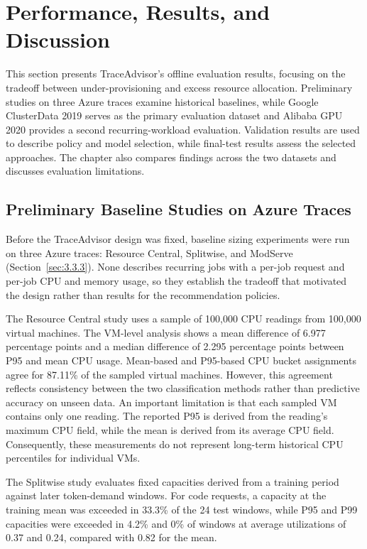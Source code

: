 \section{Performance, Results, and Discussion}\label{sec:7}

This section presents TraceAdvisor's offline evaluation results, focusing on the tradeoff between under-provisioning and excess resource allocation. Preliminary studies on three Azure traces examine historical baselines, while Google ClusterData 2019 \cite{ref7} serves as the primary evaluation dataset and Alibaba GPU 2020 \cite{ref19} provides a second recurring-workload evaluation. Validation results are used to describe policy and model selection, while final-test results assess the selected approaches. The chapter also compares findings across the two datasets and discusses evaluation limitations.

\subsection{Preliminary Baseline Studies on Azure Traces}\label{sec:7.1}

Before the TraceAdvisor design was fixed, baseline sizing experiments were run on three Azure traces: Resource Central, Splitwise, and ModServe (Section~\ref{sec:3.3.3}). None describes recurring jobs with a per-job request and per-job CPU and memory usage, so they establish the tradeoff that motivated the design rather than results for the recommendation policies.

The Resource Central study uses a sample of 100,000 CPU readings from 100,000 virtual machines. The VM-level analysis shows a mean difference of 6.977 percentage points and a median difference of 2.295 percentage points between P95 and mean CPU usage. Mean-based and P95-based CPU bucket assignments agree for 87.11\% of the sampled virtual machines. However, this agreement reflects consistency between the two classification methods rather than predictive accuracy on unseen data. An important limitation is that each sampled VM contains only one reading. The reported P95 is derived from the reading's maximum CPU field, while the mean is derived from its average CPU field. Consequently, these measurements do not represent long-term historical CPU percentiles for individual VMs.

The Splitwise study evaluates fixed capacities derived from a training period against later token-demand windows. For code requests, a capacity at the training mean was exceeded in 33.3\% of the 24 test windows, while P95 and P99 capacities were exceeded in 4.2\% and 0\% of windows at average utilizations of 0.37 and 0.24, compared with 0.82 for the mean.

